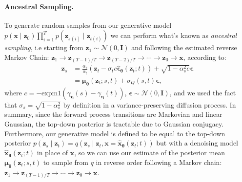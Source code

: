 \paragraph{Ancestral Sampling.} To generate random samples from our generative model $p(\mathbf{x} \mid \mathbf{z}_0)\prod_{i=1}^T p(\mathbf{z}_{s(i)} \mid \mathbf{z}_{t(i)})$ we can perform what's known as \textit{ancestral sampling}, i.e starting from $\mathbf{z}_1 \sim \mathcal{N}\left(0, \mathbf{I}\right)$ and following the estimated reverse Markov Chain: $\mathbf{z}_1 \to \mathbf{z}_{(T-1)/T} \to \mathbf{z}_{(T-2)/T} \to \cdots \to \mathbf{z}_0 \to \mathbf{x}$, according to:
%
\begin{align}
    \mathbf{z}_s & = \frac{\alpha_s}{\alpha_t} \left( \mathbf{z}_t - \sigma_t c \hat{\boldsymbol{\epsilon}}_{\boldsymbol{\theta}}(\mathbf{z}_t;t)\right) + \sqrt{1-\alpha_s^2 c} \boldsymbol{\epsilon}
    \\[5pt] & = \boldsymbol{\mu}_{\boldsymbol{\theta}}(\mathbf{z}_t;s,t) + \sigma_{Q}(s,t) \boldsymbol{\epsilon},
\end{align}
%
where $c = -\mathrm{expm1}\left(\gamma_{\boldsymbol{\eta}}(s) -\gamma_{\boldsymbol{\eta}}(t)\right)$, $\boldsymbol{\epsilon} \sim \mathcal{N}\left(0, \mathbf{I}\right)$, and we used the fact that $\sigma_s = \sqrt{1-\alpha^2_s}$ by definition in a variance-preserving diffusion process. In summary, since the forward process transitions are Markovian and linear Gaussian, the top-down posterior is tractable due to Gaussian conjugacy. Furthermore, our generative model is defined to be equal to the top-down posterior $p(\mathbf{z}_s \mid \mathbf{z}_t) = q(\mathbf{z}_s \mid \mathbf{z}_t, \mathbf{x} = \hat{\mathbf{x}}_{\boldsymbol{\theta}}(\mathbf{z}_t;t))$ but with a denoising model $\hat{\mathbf{x}}_{\boldsymbol{\theta}}(\mathbf{z}_t;t)$ in place of $\mathbf{x}$, so we can use our estimate of the posterior mean $\boldsymbol{\mu}_{\boldsymbol{\theta}}(\mathbf{z}_t;s,t)$ to sample from $q$ in reverse order following a Markov chain: $\mathbf{z}_1 \to \mathbf{z}_{(T-1)/T} \to \cdots \to \mathbf{z}_0 \to \mathbf{x}$.
%
